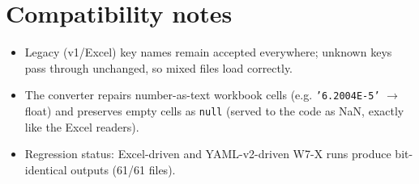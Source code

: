 \documentclass[10pt,a4paper]{article}
\newcommand{\code}[1]{\texttt{#1}}
\begin{document}
\section*{Compatibility notes}
\begin{itemize}
  \item Legacy (v1/Excel) key names remain accepted everywhere; unknown keys
        pass through unchanged, so mixed files load correctly.
  \item The converter repairs number-as-text workbook cells (e.g.
        \code{'6.2004E-5'} $\rightarrow$ float) and preserves empty cells as
        \code{null} (served to the code as NaN, exactly like the Excel
        readers).
  \item Regression status: Excel-driven and YAML-v2-driven W7-X runs produce
        bit-identical outputs (61/61 files).
\end{itemize}
\end{document}

